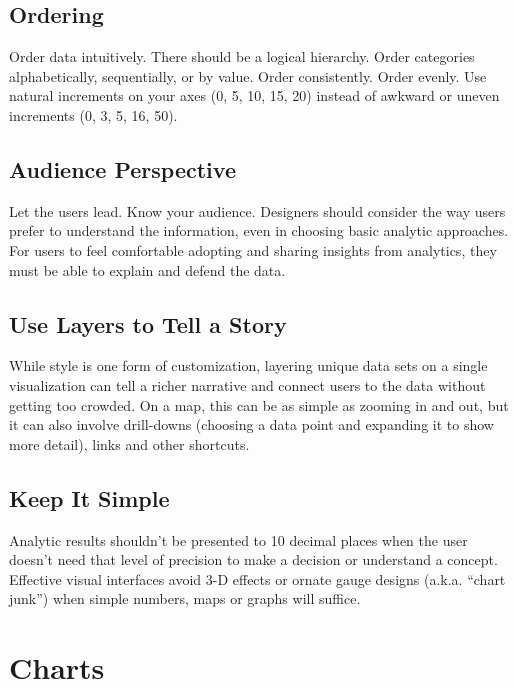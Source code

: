 \documentclass[]{book}
\begin{document}
\hypertarget{ordering}{%
\subsection{Ordering}\label{ordering}}

Order data intuitively. There should be a logical hierarchy. Order categories alphabetically, sequentially, or by value. Order consistently. Order evenly. Use natural increments on your axes (0, 5, 10, 15, 20) instead of awkward or uneven increments (0, 3, 5, 16, 50).

\hypertarget{audience-perspective}{%
\subsection{Audience Perspective}\label{audience-perspective}}

Let the users lead. Know your audience. Designers should consider the way users prefer to understand the information, even in choosing basic analytic approaches. For users to feel comfortable adopting and sharing insights from analytics, they must be able to explain and defend the data.

\hypertarget{use-layers-to-tell-a-story}{%
\subsection{Use Layers to Tell a Story}\label{use-layers-to-tell-a-story}}

While style is one form of customization, layering unique data sets on a single visualization can tell a richer narrative and connect users to the data without getting too crowded. On a map, this can be as simple as zooming in and out, but it can also involve drill-downs (choosing a data point and expanding it to show more detail), links and other shortcuts.

\hypertarget{keep-it-simple}{%
\subsection{Keep It Simple}\label{keep-it-simple}}

Analytic results shouldn't be presented to 10 decimal places when the user doesn't need that level of precision to make a decision or understand a concept. Effective visual interfaces avoid 3-D effects or ornate gauge designs (a.k.a. ``chart junk'') when simple numbers, maps or graphs will suffice.

\hypertarget{charts}{%
\section{Charts}\label{charts}}
\end{document}
